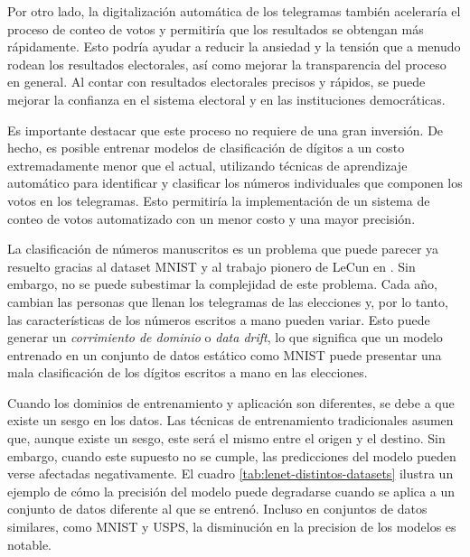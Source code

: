 Por otro lado, la digitalización automática de los telegramas también aceleraría el proceso de conteo de votos y
permitiría que los resultados se obtengan más rápidamente. Esto podría ayudar a reducir la ansiedad y la tensión que a
menudo rodean los resultados electorales, así como mejorar la transparencia del proceso en general. Al contar con
resultados electorales precisos y rápidos, se puede mejorar la confianza en el sistema electoral y en las instituciones
democráticas.

Es importante destacar que este proceso no requiere de una gran inversión. De hecho, es posible entrenar modelos de
clasificación de dígitos a un costo extremadamente menor que el actual, utilizando técnicas de aprendizaje automático
para identificar y clasificar los números individuales que componen los votos en los telegramas. Esto permitiría la
implementación de un sistema de conteo de votos automatizado con un menor costo y una mayor precisión.

La clasificación de números manuscritos es un problema que puede parecer ya resuelto gracias al dataset MNIST y al
trabajo pionero de LeCun en \citeyear{lecun1998gradient}. Sin embargo, no se puede subestimar la complejidad de este
problema. Cada año, cambian las personas que llenan los telegramas de las elecciones y, por lo tanto, las
características de los números escritos a mano pueden variar. Esto puede generar un {\it corrimiento de dominio} o {\it
        data drift}, lo que significa que un modelo entrenado en un conjunto de datos estático como MNIST puede presentar una
mala clasificación de los dígitos escritos a mano en las elecciones.

Cuando los dominios de entrenamiento y aplicación son diferentes, se debe a que existe un sesgo en los datos. Las
técnicas de entrenamiento tradicionales asumen que, aunque existe un sesgo, este será el mismo entre el origen y el
destino. Sin embargo, cuando este supuesto no se cumple, las predicciones del modelo pueden verse afectadas
negativamente. El cuadro \ref{tab:lenet-distintos-datasets} ilustra un ejemplo de cómo la precisión del modelo puede
degradarse cuando se aplica a un conjunto de datos diferente al que se entrenó. Incluso en conjuntos de datos
similares, como MNIST y USPS, la disminución en la precision de los modelos es notable.

